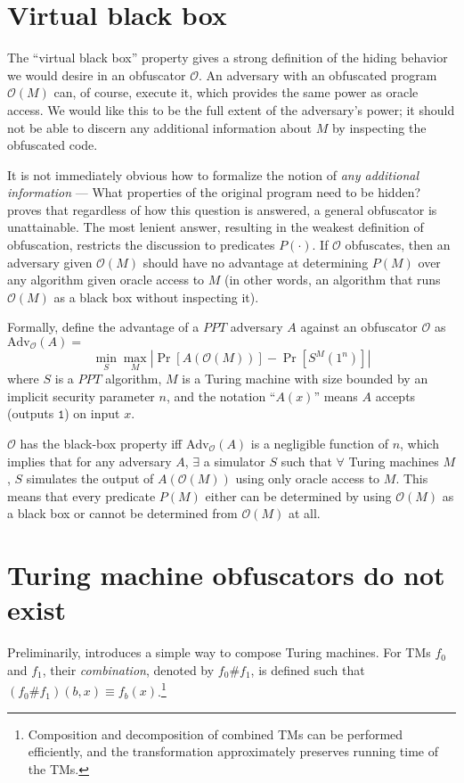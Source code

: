 \documentclass[10pt,twocolumn]{article}
\newcommand{\abs}[1]{{\ensuremath{\left\vert#1\right\vert}}}
\def\one{\texttt{1}}
\def\ppt{\textit{PPT}}
\def\obf{\ensuremath{\mathcal{O}}}
\def\Adv{\text{Adv}}
\begin{document}
  \section{Virtual black box}

    The ``virtual black box'' property gives a strong definition of the hiding behavior we would desire
    in an obfuscator $\obf$.
    An adversary with an obfuscated program $\obf(M)$ can, of course, execute it, which provides the same
    power as oracle access.
    We would like this to be the full extent of the adversary's power; it should not be able to discern
    any additional information about $M$ by inspecting the obfuscated code.

    It is not immediately obvious how to formalize the notion of \textit{any additional information} ---
    What properties of the original program need to be hidden?
    \cite{onThe(Im)possibility} proves that regardless of how this question is answered,
    a general obfuscator is unattainable.
    The most lenient answer, resulting in the weakest definition of obfuscation, restricts the discussion
    to predicates $P(\cdot)$. If $\obf$ obfuscates, then an adversary given $\obf(M)$ should have no advantage
    at determining $P(M)$ over any algorithm given oracle access to $M$ (in other words, an algorithm
    that runs $\obf(M)$ as a black box without inspecting it).

    Formally, define the advantage of a $\ppt$ adversary $A$ against an obfuscator $\obf$ as $\Adv_\obf(A) =$
    \[ \min_S \max_M \abs{ \Pr[ A(\obf(M)) ] - \Pr[ S^M(1^n) ] } \]
    where $S$ is a $\ppt$ algorithm, $M$ is a Turing machine with size bounded by an implicit security parameter $n$,
    and the notation ``$A(x)$'' means $A$ accepts (outputs $\one$) on input $x$.

    $\obf$ has the black-box property iff $\Adv_\obf(A)$ is a negligible function of $n$,
    which implies that for any adversary $A$, $\exists$ a simulator $S$ such that $\forall$ Turing machines $M$,
    $S$ simulates the output of $A(\obf(M))$ using only oracle access to $M$.
    This means that every predicate $P(M)$ either can be determined by using $\obf(M)$ as a black box
    or cannot be determined from $\obf(M)$ at all.

  \section{Turing machine obfuscators do not exist}

    Preliminarily, \cite{onThe(Im)possibility} introduces a simple way to compose Turing machines.
    For TMs $f_0$ and $f_1$, their \textit{combination}, denoted by $f_0\#f_1$, is defined such that
    $(f_0\#f_1)(b,x) \equiv f_b(x)$.\footnote{Composition and decomposition of combined TMs can be performed
    efficiently, and the transformation approximately preserves running time of the TMs.}
\end{document}
